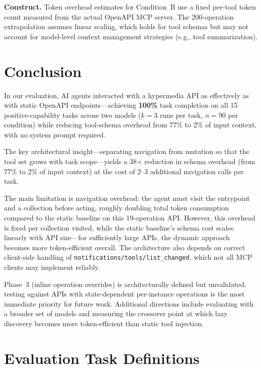 \documentclass[11pt,a4paper]{article}
\begin{document}
\textbf{Construct.} Token overhead estimates for Condition~B use a fixed per-tool token count measured from the actual OpenAPI MCP server. The 200-operation extrapolation assumes linear scaling, which holds for tool schemas but may not account for model-level context management strategies (e.g., tool summarization).

\section{Conclusion}

In our evaluation, AI agents interacted with a hypermedia API as effectively as with static OpenAPI endpoints---achieving \textbf{100\%} task completion on all 15 positive-capability tasks across two models ($k{=}3$ runs per task, $n{=}90$ per condition) while reducing tool-schema overhead from 77\% to 2\% of input context, with no system prompt required.

The key architectural insight---separating navigation from mutation so that the tool set grows with task scope---yields a 38$\times$ reduction in schema overhead (from 77\% to 2\% of input context) at the cost of 2--3 additional navigation calls per task.

The main limitation is navigation overhead: the agent must visit the entrypoint and a collection before acting, roughly doubling total token consumption compared to the static baseline on this 19-operation API. However, this overhead is fixed per collection visited, while the static baseline's schema cost scales linearly with API size---for sufficiently large APIs, the dynamic approach becomes more token-efficient overall. The architecture also depends on correct client-side handling of \texttt{notifications/tools/list\_changed}, which not all MCP clients may implement reliably.

Phase~3 (inline operation overrides) is architecturally defined but unvalidated; testing against APIs with state-dependent per-instance operations is the most immediate priority for future work. Additional directions include evaluating with a broader set of models and measuring the crossover point at which lazy discovery becomes more token-efficient than static tool injection.




\appendix

\section{Evaluation Task Definitions}
\label{appendix:tasks}
\end{document}
